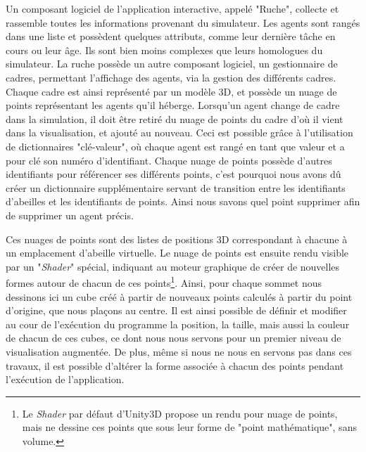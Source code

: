 	
		Un composant logiciel de l'application interactive, appelé "Ruche", collecte et rassemble toutes les informations provenant du simulateur. Les agents sont rangés dans une liste et possèdent quelques attributs, comme leur dernière tâche en cours ou leur âge. Ils sont bien moins complexes que leurs homologues du simulateur. La ruche possède un autre composant logiciel, un gestionnaire de cadres, permettant l'affichage des agents, via la gestion des différents cadres. Chaque cadre est ainsi représenté par un modèle 3D, et possède un nuage de points représentant les agents qu'il héberge. Lorsqu'un agent change de cadre dans la simulation, il doit être retiré du nuage de points du cadre d'où il vient dans la visualisation, et ajouté au nouveau. Ceci est possible grâce à l'utilisation de dictionnaires "clé-valeur", où chaque agent est rangé en tant que valeur et a pour clé son numéro d'identifiant. 
		Chaque nuage de points possède d'autres identifiants pour référencer ses différents points, c'est pourquoi nous avons dû créer un dictionnaire supplémentaire servant de transition entre les identifiants d'abeilles et les identifiants de points. Ainsi nous savons quel point supprimer afin de supprimer un agent précis.
		
		Ces nuages de points sont des listes de positions 3D correspondant à chacune à un emplacement d'abeille virtuelle. Le nuage de points est ensuite rendu visible par un "\textit{Shader}" spécial, indiquant au moteur graphique de créer de nouvelles formes autour de chacun de ces points\footnote{Le \textit{Shader} par défaut d'Unity3D propose un rendu pour nuage de points, mais ne dessine ces points que sous leur forme de "point mathématique", sans volume.}. Ainsi, pour chaque sommet nous dessinons ici un cube créé à partir de nouveaux points calculés à partir du point d'origine, que nous plaçons au centre. Il est ainsi possible de définir et modifier au cour de l'exécution du programme la position, la taille, mais aussi la couleur de chacun de ces cubes, ce dont nous nous servons pour un premier niveau de visualisation augmentée. De plus, même si nous ne nous en servons pas dans ces travaux, il est possible d'altérer la forme associée à chacun des points pendant l'exécution de l'application.
		

